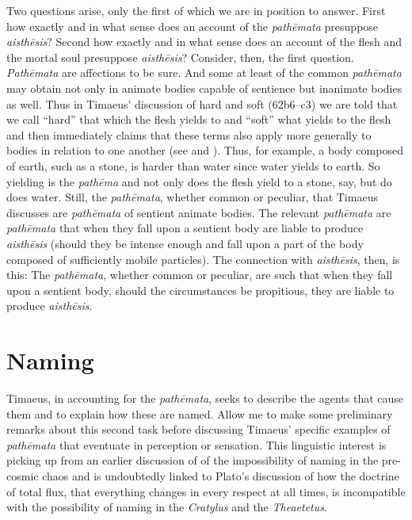 Two questions arise, only the first of which we are in position to answer. First how exactly and in what sense does an account of the \emph{pathēmata} presuppose \emph{aisthēsis}? Second how exactly and in what sense does an account of the flesh and the mortal soul presuppose \emph{aisthēsis}? Consider, then, the first question. \emph{Pathēmata} are affections to be sure. And some at least of the common \emph{pathēmata} may obtain not only in animate bodies capable of sentience but inanimate bodies as well. Thus in Timaeus' discussion of hard and soft (62b6--c3) we are told that we call ``hard'' that which the flesh yields to and ``soft'' what yields to the flesh and then immediately claims that these terms also apply more generally to bodies in relation to one another (see \citealt[228, n6]{Archer-Hind:1888qd} and \citealt[110]{OBrien:1984ji}). Thus, for example, a body composed of earth, such as a stone, is harder than water since water yields to earth. So yielding is the \emph{pathēma} and not only does the flesh yield to a stone, say, but do does water. Still, the \emph{pathēmata}, whether common or peculiar, that Timaeus discusses are \emph{pathēmata} of sentient animate bodies. The relevant \emph{pathēmata} are \emph{pathēmata} that when they fall upon a sentient body are liable to produce \emph{aisthēsis} (should they be intense enough and fall upon a part of the body composed of sufficiently mobile particles). The connection with \emph{aisthēsis}, then, is this: The \emph{pathēmata}, whether common or peculiar, are such that when they fall upon a sentient body, should the circumstances be propitious, they are liable to produce \emph{aisthēsis}.


\section{Naming} %
\label{sec:naming}

Timaeus, in accounting for the \emph{pathēmata}, seeks to describe the agents that cause them and to explain how these are named. Allow me to make some preliminary remarks about this second task before discussing Timaeus' specific examples of \emph{pathēmata} that eventuate in perception or sensation. This linguistic interest is picking up from an earlier discussion of of the impossibility of naming in the pre-cosmic chaos and is undoubtedly linked to Plato's discussion of how the doctrine of total flux, that everything changes in every respect at all times, is incompatible with the possibility of naming in the \emph{Cratylus} and the \emph{Theaetetus}.

